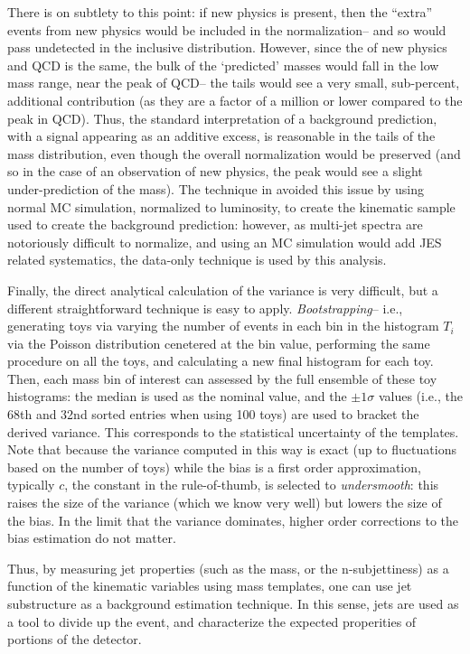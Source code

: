 There is on subtlety to this point: if new physics is present, then the ``extra'' events from new physics would be included in the normalization-- and so would pass undetected in the inclusive distribution. However, since the \pt of new physics and QCD is the same, the bulk of the `predicted' masses would fall in the low mass range, near the peak of QCD-- the tails would see a very small, sub-percent, additional contribution (as they are a factor of a million or lower compared to the peak in QCD). Thus, the standard interpretation of a background prediction, with a signal appearing as an additive excess, is reasonable in the tails of the mass distribution, even though the overall normalization would be preserved (and so in the case of an observation of new physics, the peak would see a slight under-prediction of the mass). The technique in \cite{MassTemplates} avoided this issue by using normal MC simulation, normalized to luminosity, to create the kinematic sample used to create the background prediction: however, as multi-jet \pt spectra are notoriously difficult to normalize, and using an MC simulation would add JES related systematics, the data-only technique is used by this analysis.

Finally, the direct analytical calculation of the variance is very difficult, but a different straightforward technique is easy to apply. \textit{Bootstrapping}-- i.e., generating toys via varying the number of events in each bin in the histogram $T_i$ via the Poisson distribution cenetered at the bin value, performing the same procedure on all the toys, and calculating a new final histogram for each toy. Then, each mass bin of interest can assessed by the full ensemble of these toy histograms: the median is used as the nominal value, and the $\pm 1\sigma$ values (i.e., the 68th and 32nd sorted entries when using 100 toys) are used to bracket the derived variance. This corresponds to the statistical uncertainty of the templates. Note that because the variance computed in this way is exact (up to fluctuations based on the number of toys) while the bias is a first order approximation, typically $c$, the constant in the rule-of-thumb, is selected to \textit{undersmooth}: this raises the size of the variance (which we know very well) but lowers the size of the bias. In the limit that the variance dominates, higher order corrections to the bias estimation do not matter.

Thus, by measuring jet properties (such as the mass, or the n-subjettiness) as a function of the kinematic variables using mass templates, one can use jet substructure as a background estimation technique. In this sense, jets are used as a tool to divide up the event, and characterize the expected properities of portions of the detector.
%

